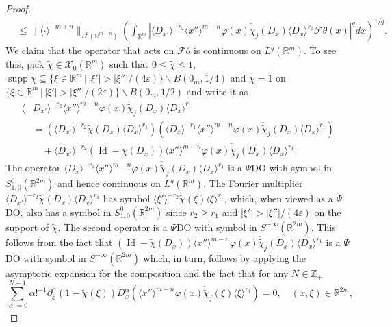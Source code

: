 \documentclass[12pt,reqno]{amsart}
\newcommand{\RR}{\mathbb R}
\newcommand{\ZZ}{\mathbb Z}
\newcommand{\XX}{\mathcal X}
\newcommand{\supp}{\operatorname{supp}}
\theoremstyle{plain}
\theoremstyle{remark}
\theoremstyle{definition}
\numberwithin{equation}{section}
\begin{document}
\begin{proof}
\begin{align}
&\leq\|\langle \cdot\rangle^{-m+n}\|_{L^p(\RR^{m-n})}\left(\int_{\RR^m}\left|\langle D_{x'}\rangle^{-r_2}\langle x''\rangle^{m-n} \varphi(x)\check{\widetilde{\chi}}_j(D_x)\langle D_x\rangle^{r_1}\mathcal{F}\theta(x)\right|^qdx\right)^{1/q}.\label{est-for-operatoronthetwithders}
\end{align}
We claim that the operator that acts on $\mathcal{F}\theta$ is continuous on $L^q(\RR^m)$. To see this, pick $\widetilde{\chi}\in\XX_0(\RR^m)$ such that $0\leq\widetilde{\chi}\leq 1$, $\supp\widetilde{\chi}\subseteq \{\xi\in\RR^m\,|\, |\xi'|>|\xi''|/(4\varepsilon)\}\backslash B(0_m,1/4)$ and $\widetilde{\chi}=1$ on $\{\xi\in\RR^m\,|\, |\xi'|>|\xi''|/(2\varepsilon)\}\backslash B(0_m,1/2)$ and write it as
\begin{align*}
\langle& D_{x'}\rangle^{-r_2}\langle x''\rangle^{m-n}\varphi(x)\check{\widetilde{\chi}}_j(D_x)\langle D_x\rangle^{r_1}\\
&=\left(\langle D_{x'}\rangle^{-r_2}\widetilde{\chi}(D_x)\langle D_x\rangle^{r_1}\right)\left(\langle D_x\rangle^{-r_1}\langle x''\rangle^{m-n}\varphi(x)\check{\widetilde{\chi}}_j(D_x)\langle D_x\rangle^{r_1}\right)\\
&{}\quad+\langle D_{x'}\rangle^{-r_2}(\operatorname{Id}-\widetilde{\chi}(D_x))\langle x''\rangle^{m-n}\varphi(x)\check{\widetilde{\chi}}_j(D_x)\langle D_x\rangle^{r_1}.
\end{align*}
The operator $\langle D_x\rangle^{-r_1}\langle x''\rangle^{m-n}\varphi(x)\check{\widetilde{\chi}}_j(D_x)\langle D_x\rangle^{r_1}$ is a $\Psi$DO with symbol in $S^0_{1,0}(\RR^{2m})$ and hence continuous on $L^q(\RR^m)$. The Fourier multiplier $\langle D_{x'}\rangle^{-r_2}\widetilde{\chi}(D_x)\langle D_x\rangle^{r_1}$ has symbol $\langle \xi'\rangle^{-r_2}\widetilde{\chi}(\xi)\langle\xi\rangle^{r_1}$, which, when viewed as a $\Psi$DO, also has a symbol in $S^0_{1,0}(\RR^{2m})$ since $r_2\geq r_1$ and $|\xi'|>|\xi''|/(4\varepsilon)$ on the support of $\widetilde{\chi}$. The second operator is a $\Psi$DO with symbol in $S^{-\infty}(\RR^{2m})$. This follows from the fact that $(\operatorname{Id}-\widetilde{\chi}(D_x))\langle x''\rangle^{m-n}\varphi(x)\check{\widetilde{\chi}}_j(D_x)\langle D_x\rangle^{r_1}$ is a $\Psi$DO with symbol in $S^{-\infty}(\RR^{2m})$ which, in turn, follows by applying the asymptotic expansion for the composition and the fact that for any $N\in\ZZ_+$
\begin{equation*}
\sum_{|\alpha|=0}^{N-1}\alpha!^{-1}\partial^{\alpha}_{\xi}(1-\widetilde{\chi}(\xi)) D^{\alpha}_x\left(\langle x''\rangle^{m-n}\varphi(x)\check{\widetilde{\chi}}_j(\xi)\langle \xi\rangle^{r_1}\right)=0,\quad (x,\xi)\in\RR^{2m},

\end{equation*}
\end{proof}
\end{document}
